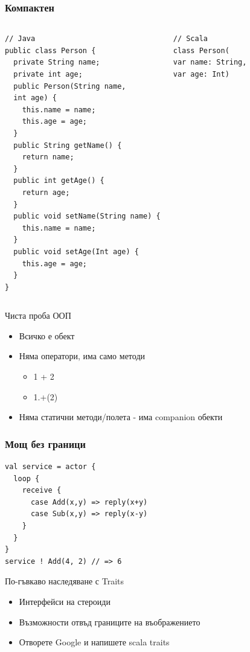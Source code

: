 \documentclass[compress,red]{beamer}
\begin{document}
\begin{frame}[fragile]
  \frametitle{Компактен}
  \transdissolve
\begin{columns}
\begin{lstlisting}[basicstyle=\tiny]
// Java
public class Person {
  private String name;
  private int age;
  public Person(String name,
  int age) {
    this.name = name;
    this.age = age;
  }
  public String getName() {
    return name;
  }
  public int getAge() {
    return age;
  }
  public void setName(String name) {
    this.name = name;
  }
  public void setAge(Int age) {
    this.age = age;
  }
}
\end{lstlisting}
\begin{lstlisting}[basicstyle=\tiny]
// Scala
class Person(
var name: String,
var age: Int)
\end{lstlisting}
\end{columns}
\end{frame}

\begin{frame}{Чиста проба ООП}
  \transdissolve
  \begin{itemize}
  \item Всичко е обект
  \item Няма оператори, има само методи
    \begin{itemize}
      \item 1 + 2
      \item 1.+(2)
    \end{itemize}
  \item Няма статични методи/полета - има companion обекти
  \end{itemize}
\end{frame}

\begin{frame}[fragile]
  \frametitle{Мощ без граници}
  \transdissolve
\begin{lstlisting}
val service = actor {
  loop {
    receive {
      case Add(x,y) => reply(x+y)
      case Sub(x,y) => reply(x-y)
    }
  }
}
service ! Add(4, 2) // => 6 
\end{lstlisting}
\end{frame}

\begin{frame}{По-гъвкаво наследяване с Traits}
  \transdissolve
  \begin{itemize}
  \item Интерфейси на стероиди
  \item Възможности отвъд границите на въображението
  \item Отворете Google и напишете scala traits
  \end{itemize}
\end{frame}
\end{document}
